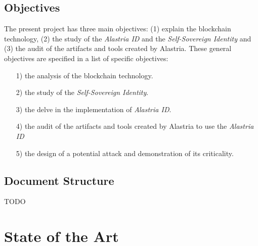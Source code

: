 \documentclass[a4paper, 12pt]{article} %
\begin{document}
        \subsection{Objectives}
            The present project has three main objectives: (1) explain the blockchain technology, (2) the study of the \textit{Alastria ID} and the \textit{Self-Sovereign Identity} and (3) the audit of the artifacts and tools created by Alastria. These general objectives are specified in a list of specific objectives:
            \begin{itemize}
                \item[1)] the analysis of the blockchain technology.
                \item[2)] the study of the \textit{Self-Sovereign Identity}.
                \item[3)] the delve in the implementation of \textit{Alastria ID}.
                \item[4)] the audit of the artifacts and tools created by Alastria to use the \textit{Alastria ID}
                \item[5)] the design of a potential attack and demonstration of its criticality.
            \end{itemize}
            
        \subsection{Document Structure}
            TODO
        \newpage
        
\section{State of the Art}
\end{document}
